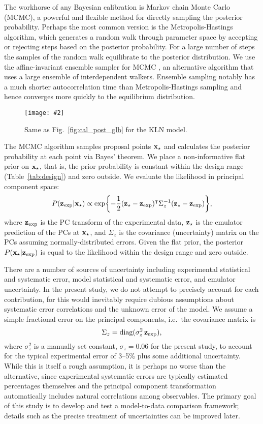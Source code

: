 \documentclass[aps,prc,reprint,superscriptaddress,amsmath]{revtex4-1}
\newcommand{\widefig}[3][t]{
  \begin{figure*}[#1]
    \texttt{[image: \#2]}
    \caption{\label{fig:#2}#3}
  \end{figure*}
}
\newcommand{\tran}{^\intercal}
\begin{document}
The workhorse of any Bayesian calibration is Markov chain Monte Carlo (MCMC), a powerful and flexible method for directly sampling the posterior probability.
Perhaps the most common version is the Metropolis-Hastings algorithm, which generates a random walk through parameter space by accepting or rejecting steps based on the posterior probability.
For a large number of steps the samples of the random walk equilibrate to the posterior distribution.
We use the affine-invariant ensemble sampler for MCMC \cite{Goodman:2010en,FM:2013mc}, an alternative algorithm that uses a large ensemble of interdependent walkers.
Ensemble sampling notably has a much shorter autocorrelation time than Metropolis-Hastings sampling and hence converges more quickly to the equilibrium distribution.

\widefig{cal_post_kln}{
  Same as Fig.~\ref{fig:cal_post_glb} for the KLN model.
}

The MCMC algorithm samples proposal points $\mathbf x_\star$ and calculates the posterior probability at each point via Bayes' theorem.
We place a non-informative flat prior on $\mathbf x_\star$, that is, the prior probability is constant within the design range (Table~\ref{tab:design}) and zero outside.
We evaluate the likelihood in principal component space:
\begin{equation}
  P(\zexp|\xs) \propto \exp\biggl\{ -\frac{1}{2} (\zs - \zexp)\tran \Sigma_z^{-1} (\zs - \zexp) \biggr\},
  \label{eq:likelihood}
\end{equation}
where $\mathbf z_\text{exp}$ is the PC transform of the experimental data, $\mathbf z_\star$ is the emulator prediction of the PCs at $\mathbf x_\star$, and $\Sigma_z$ is the covariance (uncertainty) matrix on the PCs assuming normally-distributed errors.
Given the flat prior, the posterior $P(\mathbf x_\star|\mathbf z_\text{exp})$ is equal to the likelihood within the design range and zero outside.

There are a number of sources of uncertainty including experimental statistical and systematic error, model statistical and systematic error, and emulator uncertainty.
In the present study, we do not attempt to precisely account for each contribution, for this would inevitably require dubious assumptions about systematic error correlations and the unknown error of the model.
We assume a simple fractional error on the principal components, i.e.\ the covariance matrix is
\begin{equation}
  \Sigma_z = \text{diag}(\sigma^2_z\,\mathbf z_\text{exp}),
\end{equation}
where $\sigma^2_z$ is a manually set constant, $\sigma_z = 0.06$ for the present study, to account for the typical experimental error of 3--5\% \cite{Abelev:2014mda} plus some additional uncertainty.
While this is itself a rough assumption, it is perhaps no worse than the alternative, since experimental systematic errors are typically estimated percentages themselves and the principal component transformation automatically includes natural correlations among observables.
The primary goal of this study is to develop and test a model-to-data comparison framework; details such as the precise treatment of uncertainties can be improved later.
\end{document}

